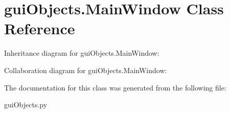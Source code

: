 \hypertarget{classguiObjects_1_1MainWindow}{}\section{gui\+Objects.\+Main\+Window Class Reference}
\label{classguiObjects_1_1MainWindow}


Inheritance diagram for gui\+Objects.\+Main\+Window\+:


Collaboration diagram for gui\+Objects.\+Main\+Window\+:


The documentation for this class was generated from the following file\+:\begin{DoxyCompactItemize}
\item 
gui\+Objects.\+py\end{DoxyCompactItemize}
